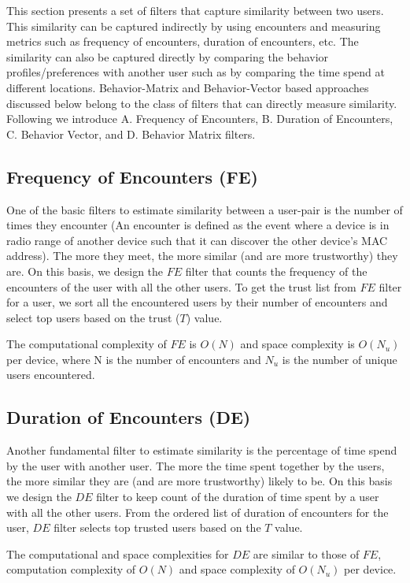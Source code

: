 \documentclass[10pt,conference]{IEEEtran}
\begin{document}
This section presents a set of filters that capture similarity between two users. This similarity can be captured indirectly by using encounters  and measuring metrics such as frequency of encounters, duration of encounters, etc. The similarity can also be captured directly by comparing the behavior profiles/preferences with another user such as by comparing the time spend at different locations. Behavior-Matrix and Behavior-Vector based approaches discussed below belong to the class of filters that can directly measure similarity.  Following we introduce A. Frequency of Encounters, B. Duration of Encounters, C. Behavior Vector, and D. Behavior Matrix filters.



\subsection{Frequency of Encounters (FE)}
One of the basic filters to estimate similarity between a user-pair is the number of times they encounter (An encounter is defined as the event where a device is in radio range of another device such that it can discover the other device's MAC address).  The more they meet, the more similar (and are more trustworthy) they are.  On this basis, we design  the $FE$ filter that counts the frequency of the encounters of the user with all the other users. To get the trust list from $FE$ filter for a user, we sort all the encountered users by their number of encounters and select top users based on the trust ($T$) value. 

The computational complexity of $FE$ is $O(N)$ and space complexity is $O(N_u)$ per device, where N is the number of encounters and $N_u$ is the number of unique users encountered.


\subsection{Duration of Encounters (DE)}
Another fundamental filter to estimate similarity is the percentage of time spend by the user with another user. The more the time spent together by the users, the more similar they are (and are more trustworthy) likely to be. On this basis we design the $DE$ filter to keep count of the duration of time spent by a user with all the other users. From the ordered list of duration of encounters for the user, $DE$ filter selects top trusted users based on the $T$ value. 

The computational and space complexities for $DE$ are similar to those of $FE$, computation complexity of $O(N)$ and space complexity of $O(N_u)$ per device.
\end{document}
